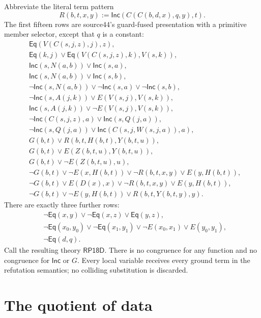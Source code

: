 \documentclass[11pt]{article}
\newcommand{\Eq}{\mathsf{Eq}}
\newcommand{\Inc}{\mathsf{Inc}}
\newcommand{\RP}{\mathsf{RP18D}}
\begin{document}
Abbreviate the literal term pattern
\[
 R(b,t,x,y):=\Inc(C(C(b,d,x),q,y),t).
\]
The first fifteen rows are source44's guard-fused presentation with a
primitive member selector, except that $q$ is a constant:
\begin{align}
&\Eq(V(C(s,j,z),j),z),\tag{01}\label{rp01}\\
&\Eq(k,j)\lor\Eq(V(C(s,j,z),k),V(s,k)),\tag{02}\label{rp02}\\
&\Inc(s,N(a,b))\lor\Inc(s,a),\tag{03}\label{rp03}\\
&\Inc(s,N(a,b))\lor\Inc(s,b),\tag{04}\label{rp04}\\
&\neg\Inc(s,N(a,b))\lor\neg\Inc(s,a)\lor\neg\Inc(s,b),\tag{05}\label{rp05}\\
&\neg\Inc(s,A(j,k))\lor E(V(s,j),V(s,k)),\tag{06}\label{rp06}\\
&\Inc(s,A(j,k))\lor\neg E(V(s,j),V(s,k)),\tag{07}\label{rp07}\\
&\neg\Inc(C(s,j,z),a)\lor\Inc(s,Q(j,a)),\tag{08}\label{rp08}\\
&\neg\Inc(s,Q(j,a))\lor\Inc(C(s,j,W(s,j,a)),a),\tag{09}\label{rp09}\\
&G(b,t)\lor R(b,t,H(b,t),Y(b,t,u)),\tag{10}\label{rp10}\\
&G(b,t)\lor E(Z(b,t,u),Y(b,t,u)),\tag{11}\label{rp11}\\
&G(b,t)\lor\neg E(Z(b,t,u),u),\tag{12}\label{rp12}\\
&\neg G(b,t)\lor\neg E(x,H(b,t))\lor\neg R(b,t,x,y)
                  \lor E(y,H(b,t)),\tag{13}\label{rp13}\\
&\neg G(b,t)\lor E(D(x),x)\lor\neg R(b,t,x,y)
                  \lor E(y,H(b,t)),\tag{14}\label{rp14}\\
&\neg G(b,t)\lor\neg E(y,H(b,t))\lor R(b,t,Y(b,t,y),y).\tag{15}\label{rp15}
\end{align}
There are exactly three further rows:
\begin{align}
&\neg\Eq(x,y)\lor\neg\Eq(x,z)\lor\Eq(y,z),\tag{16}\label{rp16}\\
&\neg\Eq(x_0,y_0)\lor\neg\Eq(x_1,y_1)
            \lor\neg E(x_0,x_1)\lor E(y_0,y_1),\tag{17}\label{rp17}\\
&\neg\Eq(d,q).\tag{18}\label{rp18}
\end{align}
Call the resulting theory $\RP$. There is no congruence for any function and no
congruence for $\Inc$ or $G$. Every local variable receives every ground
term in the refutation semantics; no colliding substitution is discarded.

\section{The quotient of data}
\end{document}
